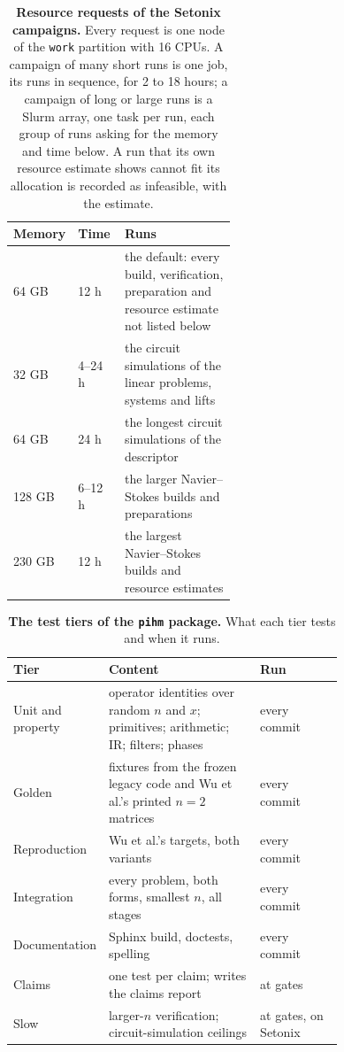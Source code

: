\begin{table}[htbp]
    \centering
    \caption[Resource requests of the Setonix campaigns]{\textbf{Resource requests of the Setonix campaigns.} Every request is one node of the \texttt{work} partition with 16 CPUs. A campaign of many short runs is one job, its runs in sequence, for 2 to 18 hours; a campaign of long or large runs is a Slurm array, one task per run, each group of runs asking for the memory and time below. A run that its own resource estimate shows cannot fit its allocation is recorded as infeasible, with the estimate.}
    \label{tab:resource-classes}
    \small
    \begin{tabular}{@{}l l p{0.5\linewidth}@{}}
        \toprule
        Memory & Time & Runs \\
        \midrule
        64 GB & 12 h & the default: every build, verification, preparation and resource estimate not listed below \\
        32 GB & 4--24 h & the circuit simulations of the linear problems, systems and lifts \\
        64 GB & 24 h & the longest circuit simulations of the descriptor \\
        128 GB & 6--12 h & the larger Navier--Stokes builds and preparations \\
        230 GB & 12 h & the largest Navier--Stokes builds and resource estimates \\
        \bottomrule
    \end{tabular}
\end{table}

\begin{table}[htbp]
    \centering
    \caption[The test tiers of the \texttt{pihm} package]{\textbf{The test tiers of the \texttt{pihm} package.} What each tier tests and when it runs.}
    \label{tab:test-tiers}
    \small
    \begin{tabular}{@{}l p{0.48\linewidth} p{0.26\linewidth}@{}}
        \toprule
        Tier & Content & Run \\
        \midrule
        Unit and property & operator identities over random $n$ and $x$; primitives; arithmetic; IR; filters; phases & every commit \\
        Golden & fixtures from the frozen legacy code and Wu et al.'s printed $n = 2$ matrices & every commit \\
        Reproduction & Wu et al.'s targets, both variants & every commit \\
        Integration & every problem, both forms, smallest $n$, all stages & every commit \\
        Documentation & Sphinx build, doctests, spelling & every commit \\
        Claims & one test per claim; writes the claims report & at gates \\
        Slow & larger-$n$ verification; circuit-simulation ceilings & at gates, on Setonix \\
        \bottomrule
    \end{tabular}
\end{table}

